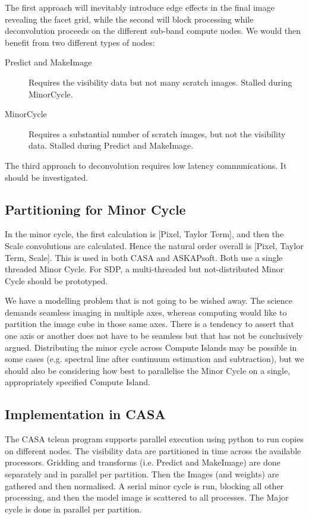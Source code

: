 \documentclass[11pt,a4paper,variablewidth]{article}
\begin{document}
The first approach will inevitably introduce edge effects in the final image revealing the facet grid, while the second will block processing while deconvolution proceeds on the different sub-band compute nodes. We would then benefit from two different types of nodes:
\begin{description}
\item[Predict and MakeImage] Requires the visibility data but not many scratch images. Stalled during MinorCycle.
\item[MinorCycle] Requires a substantial number of scratch images, but not the visibility data. Stalled during Predict and MakeImage.	
\end{description}

The third approach to deconvolution requires low latency communications. It should be investigated.

\subsection{Partitioning for Minor Cycle}

In the minor cycle, the first calculation is [Pixel, Taylor Term], and then the Scale convolutions are calculated. Hence the natural order overall is [Pixel, Taylor Term, Scale]. This is used in both CASA and ASKAPsoft. Both use a single threaded Minor Cycle. For SDP, a multi-threaded but not-distributed Minor Cycle should be prototyped.

We have a modelling problem that is not going to be wished away. The science demands seamless imaging in multiple axes, whereas computing would like to partition the image cube in those same axes. There is a tendency to assert that one axis or another does not have to be seamless but that has not be conclusively argued. Distributing the minor cycle across Compute Islands may be possible in some cases (e.g. spectral line after continuum estimation and subtraction), but we should also be considering how best to parallelise the Minor Cycle on a single, appropriately specified Compute Island.

\subsection{Implementation in CASA}

The CASA tclean program supports parallel execution using python to run copies on different nodes. The visibility data are partitioned in time across the available processors. Gridding and transforms (i.e. Predict and MakeImage) are done separately and in parallel per partition. Then the Images (and weights) are gathered and then normalised. A serial minor cycle is run, blocking all other processing, and then the model image is scattered to all processes. The Major cycle is done in parallel per partition.
\end{document}
